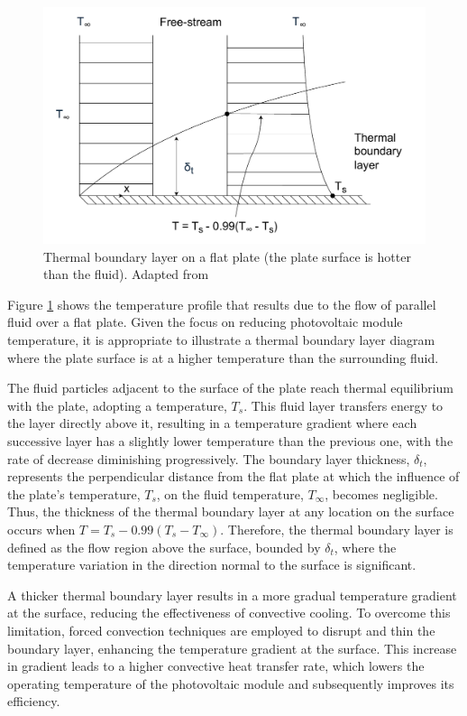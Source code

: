 \begin{figure}[ht]
    \centering
    \includegraphics[width=0.7\linewidth]{Figures/thermal_boundary_layer.pdf}
    \caption{Thermal boundary layer on a flat plate (the plate surface is hotter than the fluid). Adapted from \cite{Cengel2014FundamentalsConvection}}
    \label{fig:thermal_boundary_layer}
\end{figure}

Figure \ref{fig:thermal_boundary_layer} shows the temperature profile that results due to the flow of parallel fluid over a flat plate. Given the focus on reducing photovoltaic module temperature, it is appropriate to illustrate a thermal boundary layer diagram where the plate surface is at a higher temperature than the surrounding fluid.\vspace{0.5em}

The fluid particles adjacent to the surface of the plate reach thermal equilibrium with the plate, adopting a temperature, $T_s$. This fluid layer transfers energy to the layer directly above it, resulting in a temperature gradient where each successive layer has a slightly lower temperature than the previous one, with the rate of decrease diminishing progressively. The boundary layer thickness, $\delta_t$, represents the perpendicular distance from the flat plate at which the influence of the plate's temperature, $T_s$, on the fluid temperature, $T_\infty$, becomes negligible. Thus, the thickness of the thermal boundary layer at any location on the surface occurs when $T = T_s-0.99(T_s-T_\infty)$. Therefore, the thermal boundary layer is defined as the flow region above the surface, bounded by $\delta_t$, where the temperature variation in the direction normal to the surface is significant. \cite{Cengel2014FundamentalsConvection}\vspace{0.5em}

A thicker thermal boundary layer results in a more gradual temperature gradient at the surface, reducing the effectiveness of convective cooling. To overcome this limitation, forced convection techniques are employed to disrupt and thin the boundary layer, enhancing the temperature gradient at the surface. This increase in gradient leads to a higher convective heat transfer rate, which lowers the operating temperature of the photovoltaic module and subsequently improves its efficiency.\vspace{0.5em}


